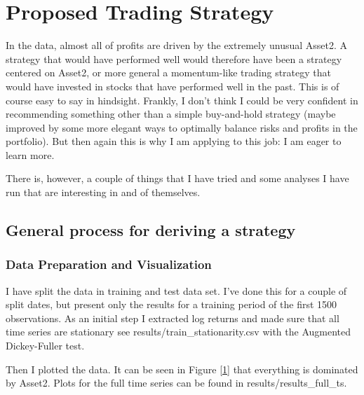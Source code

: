 

\chapter{Proposed Trading Strategy}

In the data, almost all of profits are driven by the extremely unusual Asset2. A strategy that would have performed well would therefore have been a strategy centered on Asset2, or more general a momentum-like trading strategy that would have invested in stocks that have performed well in the past. This is of course easy to say in hindsight. Frankly, I don't think I could be very confident in recommending something other than a simple buy-and-hold strategy (maybe improved by some more elegant ways to optimally balance risks and profits in the portfolio). But then again this is why I am applying to this job: I am eager to learn more. 

There is, however, a couple of things that I have tried and some analyses I have run that are interesting in and of themselves. 

\section{General process for deriving a strategy}
\subsection{Data Preparation and Visualization}
I have split the data in training and test data set. I've done this for a couple of split dates, but present only the results for a training period of the first 1500 observations. As an initial step I extracted log returns and made sure that all time series are stationary see results\slash train\_stationarity.csv with the Augmented Dickey-Fuller test. 

Then I plotted the data. It can be seen in Figure \ref{1} that everything is dominated by Asset2. Plots for the full time series can be found in results\slash results\_full\_ts.  


